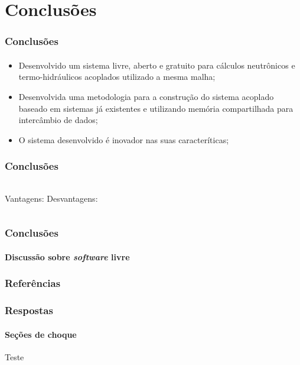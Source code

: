 \documentclass[svgnames,smaller,table]{beamer}
\begin{document}
\section{Conclusões}
\begin{frame}
  \frametitle{Conclusões}
  \framesubtitle{}
  \begin{itemize}
  \item Desenvolvido um sistema livre, aberto e gratuito para cálculos neutrônicos e termo-hidráulicos acoplados utilizado a mesma malha;
  \item Desenvolvida uma metodologia para a construção do sistema acoplado baseado em sistemas já existentes e utilizando memória compartilhada
    para intercâmbio de dados;
  \item O sistema desenvolvido é inovador nas suas caracteríticas;
  \end{itemize}
\end{frame}

\begin{frame}
  \frametitle{Conclusões}
  \framesubtitle{}
  \begin{columns}
    Vantagens:
    Desvantagens:
  \end{columns}
\end{frame}

\begin{frame}
  \frametitle{Conclusões}
  \framesubtitle{Discussão sobre \textit{software} livre}
\end{frame}

\begin{frame}
  \frametitle{Conclusões}
  \framesubtitle{Trabalhos futuros} livre}
\end{frame}



\begin{frame}[allowframebreaks]
        \frametitle{Referências}
        
        
\end{frame}


\begin{frame}[noframenumbering]
  \frametitle{Respostas}
  \framesubtitle{Seções de choque}
  Teste
\end{frame}
\end{document}
